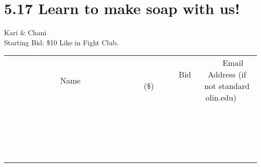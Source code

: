 \documentclass[11pt]{article}
\begin{document}
\section*{5.17 Learn to make soap with us!}
Kari \& Chani
\\
Starting Bid: \$10
\newline
Like in Fight Club.
\\[3ex]
\begin{tabular}{c c c}
~~~~~~~~~~~~~Name~~~~~~~~~~~~~ & ~~~~~~~~~Bid (\$)~~~~~~~~~  & ~~~Email Address (if not standard olin.edu)~~~\\
 & & \\
\hline
 & & \\
\hline
 & & \\
\hline
 & & \\
\hline
 & & \\
\hline
 & & \\
\hline
 & & \\
\hline
 & & \\
\hline
 & & \\
\hline
 & & \\
\hline
 & & \\
\hline
 & & \\
\hline
 & & \\
\hline
 & & \\
\hline
 & & \\
\hline
 & & \\
\hline
 & & \\
\hline
 & & \\
\hline
 & & \\
\hline
\end{tabular}
\newpage
\end{document}
